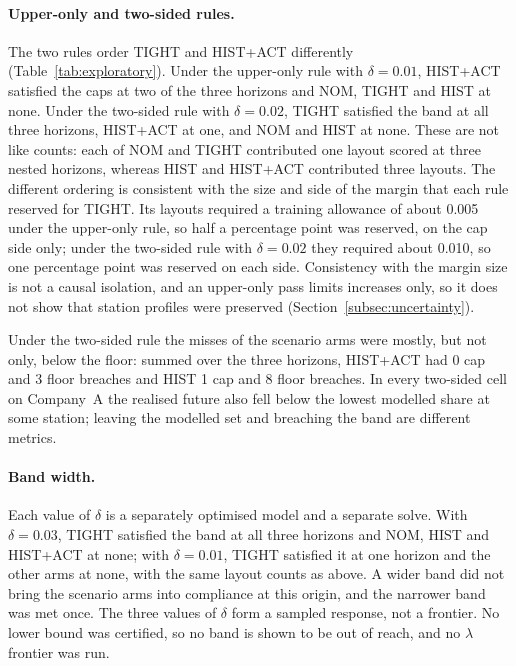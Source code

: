 \paragraph{Upper-only and two-sided rules.} The two rules order TIGHT and HIST+ACT differently (Table~\ref{tab:exploratory}). Under the upper-only rule with $\delta=0.01$, HIST+ACT satisfied the caps at two of the three horizons and NOM, TIGHT and HIST at none. Under the two-sided rule with $\delta=0.02$, TIGHT satisfied the band at all three horizons, HIST+ACT at one, and NOM and HIST at none. These are not like counts: each of NOM and TIGHT contributed one layout scored at three nested horizons, whereas HIST and HIST+ACT contributed three layouts. The different ordering is consistent with the size and side of the margin that each rule reserved for TIGHT. Its layouts required a training allowance of about 0.005 under the upper-only rule, so half a percentage point was reserved, on the cap side only; under the two-sided rule with $\delta=0.02$ they required about 0.010, so one percentage point was reserved on each side. Consistency with the margin size is not a causal isolation, and an upper-only pass limits increases only, so it does not show that station profiles were preserved (Section~\ref{subsec:uncertainty}).

Under the two-sided rule the misses of the scenario arms were mostly, but not only, below the floor: summed over the three horizons, HIST+ACT had 0 cap and 3 floor breaches and HIST 1 cap and 8 floor breaches. In every two-sided cell on Company~A the realised future also fell below the lowest modelled share at some station; leaving the modelled set and breaching the band are different metrics.

\paragraph{Band width.} Each value of $\delta$ is a separately optimised model and a separate solve. With $\delta=0.03$, TIGHT satisfied the band at all three horizons and NOM, HIST and HIST+ACT at none; with $\delta=0.01$, TIGHT satisfied it at one horizon and the other arms at none, with the same layout counts as above. A wider band did not bring the scenario arms into compliance at this origin, and the narrower band was met once. The three values of $\delta$ form a sampled response, not a frontier. No lower bound was certified, so no band is shown to be out of reach, and no $\lambda$ frontier was run.

